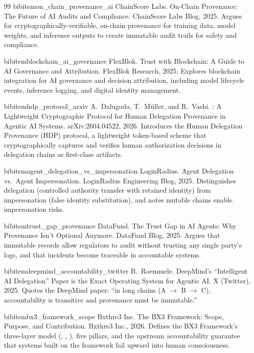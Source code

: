 \begin{thebibliography}{99}
bibitem{on_chain_provenance_ai}
ChainScore Labs.
\newblock On-Chain {Provenance}: The {Future} of {AI} {Audits} and {Compliance}.
\newblock ChainScore Labs Blog, 2025.
\newblock Argues for cryptographically-verifiable, on-chain provenance for training data, model weights, and inference outputs to create immutable audit trails for safety and compliance.

bibitem{blockchain_ai_governance}
FlexBlok.
 {Trust} with {Blockchain}: A {Guide} to {AI} {Governance} and {Attribution}.
\newblock FlexBlok Research, 2025.
\newblock Explores blockchain integration for AI governance and decision attribution, including model lifecycle events, inference logging, and digital identity management.

bibitem{hdp_protocol_arxiv}
A.\ Dalugoda, T.\ M{\"u}ller, and R.\ Vashi.
: A {Lightweight} {Cryptographic} {Protocol} for {Human} {Delegation} {Provenance} in {Agentic} {AI} {Systems}.
\newblock arXiv:2604.04522, 2026.
\newblock Introduces the Human Delegation Provenance (HDP) protocol, a lightweight token-based scheme that cryptographically captures and verifies human authorization decisions in delegation chains as first-class artifacts.

bibitem{agent_delegation_vs_impersonation}
LoginRadius.
\newblock Agent {Delegation} vs.\ {Agent} {Impersonation}.
\newblock LoginRadius Engineering Blog, 2025.
\newblock Distinguishes delegation (controlled authority transfer with retained identity) from impersonation (false identity substitution), and notes mutable chains enable impersonation risks.

bibitem{trust_gap_provenance}
DataFund.
\newblock The {Trust} {Gap} in {AI} {Agents}: Why {Provenance} {Isn't} {Optional} {Anymore}.
\newblock DataFund Blog, 2025.
\newblock Argues that immutable records allow regulators to audit without trusting any single party's logs, and that incidents become traceable in accountable systems.

bibitem{deepmind_accountability_twitter}
B.\ Roemmele.
\newblock DeepMind's {``Intelligent} {AI} {Delegation''} {Paper} is the {Exact} {Operating} {System} for {Agentic} {AI}.
\newblock X (Twitter), 2025.
\newblock Quotes the DeepMind paper: ``in long chains (A $\rightarrow$ B $\rightarrow$ C), accountability is transitive and provenance must be immutable.''

bibitem{bx3_framework_scope}
Bxthre3 Inc.
\newblock The {BX3} {Framework}: {Scope}, {Purpose}, and {Contribution}.
\newblock Bxthre3 Inc., 2026.
\newblock Defines the BX3 Framework's three-layer model (\purpose, \bounds, \fact), five pillars, and the upstream accountability guarantee that systems built on the framework fail upward into human consciousness.


\end{thebibliography}
